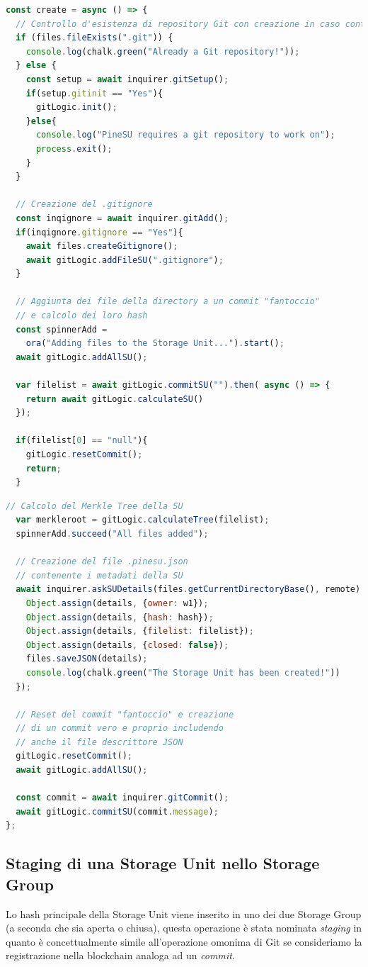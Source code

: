 \begin{lstlisting}[language=JavaScript]
const create = async () => {
  // Controllo d'esistenza di repository Git con creazione in caso contrario
  if (files.fileExists(".git")) {
    console.log(chalk.green("Already a Git repository!"));
  } else {
    const setup = await inquirer.gitSetup();
    if(setup.gitinit == "Yes"){
      gitLogic.init();
    }else{
      console.log("PineSU requires a git repository to work on");
      process.exit();
    }
  }

  // Creazione del .gitignore 
  const inqignore = await inquirer.gitAdd();
  if(inqignore.gitignore == "Yes"){
    await files.createGitignore();
    await gitLogic.addFileSU(".gitignore");
  }

  // Aggiunta dei file della directory a un commit "fantoccio"
  // e calcolo dei loro hash
  const spinnerAdd = 
    ora("Adding files to the Storage Unit...").start();
  await gitLogic.addAllSU();

  var filelist = await gitLogic.commitSU("").then( async () => {
    return await gitLogic.calculateSU()
  });
  
  if(filelist[0] == "null"){
    gitLogic.resetCommit();
    return;
  }
\end{lstlisting}
\newpage
\begin{lstlisting}[language=JavaScript, firstnumber=36]
  // Calcolo del Merkle Tree della SU
  var merkleroot = gitLogic.calculateTree(filelist);
  spinnerAdd.succeed("All files added");

  // Creazione del file .pinesu.json
  // contenente i metadati della SU
  await inquirer.askSUDetails(files.getCurrentDirectoryBase(), remote).then((details) => {
    Object.assign(details, {owner: w1});
    Object.assign(details, {hash: hash});
    Object.assign(details, {filelist: filelist});
    Object.assign(details, {closed: false});
    files.saveJSON(details);
    console.log(chalk.green("The Storage Unit has been created!"))
  });
  
  // Reset del commit "fantoccio" e creazione
  // di un commit vero e proprio includendo
  // anche il file descrittore JSON
  gitLogic.resetCommit();
  await gitLogic.addAllSU();

  const commit = await inquirer.gitCommit();
  await gitLogic.commitSU(commit.message);
};
\end{lstlisting}

\newpage

\subsection{Staging di una Storage Unit nello Storage Group}
\label{sub:stage2}
Lo hash principale della Storage Unit viene inserito in uno dei due Storage Group (a seconda che sia aperta o chiusa), questa operazione è stata nominata \emph{staging} in quanto è concettualmente simile all'operazione omonima di Git se consideriamo la registrazione nella blockchain analoga ad un \emph{commit}.


